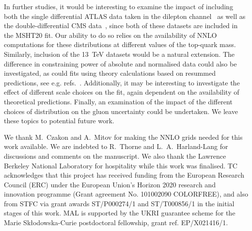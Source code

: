 \documentclass[sn-mathphys]{sn-jnl}%
\begin{document}
In further studies, it would be interesting to examine the impact of including both the single differential ATLAS data taken in the dilepton channel~\cite{ATLAS:2016pal} as well as the double-differential CMS data~\cite{CMS:2017iqf}, since both of these datasets are included in the MSHT20 fit. Our ability to do so relies on the availability of NNLO computations for these distributions at different values of the top-quark mass. Similarly, inclusion of the 13~TeV datasets would be a natural extension. The difference in constraining power of absolute and normalised data could also be investigated, as could fits using theory calculations based on resummed predictions, see e.g. refs.~\cite{Li:2013mia,Catani:2018mei,Alioli:2021ggd,Ju:2022wia}. Additionally, it may be interesting to investigate the effect of different scale choices on the fit, again dependent on the availability of theoretical predictions. Finally, an examination of the impact of the different choices of distribution on the gluon uncertainty could be undertaken. We leave these topics to potential future work.


\backmatter


We thank M.~Czakon and A.~Mitov for making the NNLO grids needed for this work available. We are indebted to R.~Thorne and L.~A.~Harland-Lang for discussions and comments on the manuscript. We also thank the Lawrence Berkeley National Laboratory for hospitality while this work was finalised. TC acknowledges that this project has received funding from the European Research Council (ERC) under the European Union’s Horizon 2020 research and innovation programme (Grant agreement No. 101002090 COLORFREE), and also from STFC via grant awards ST/P000274/1 and ST/T000856/1 in the initial stages of this work. MAL is supported by the UKRI guarantee scheme for the Marie Sk\l{}odowska-Curie postdoctoral fellowship, grant ref. EP/X021416/1. 
\end{document}
